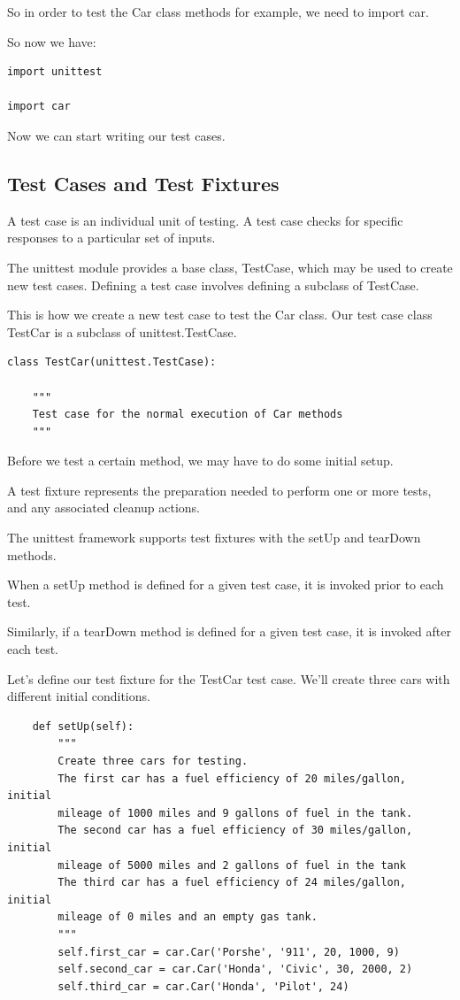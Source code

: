 \documentclass{article}
\begin{document}
So in order to test the Car class methods for example, we need to import car.

So now we have:

\begin{lstlisting}
import unittest

import car
\end{lstlisting}

Now we can start writing our test cases.

\subsection{Test Cases and Test Fixtures}
A test case is an individual unit of testing. A test case checks for specific responses to a particular set of inputs.

The unittest module provides a base class, TestCase, which may be used to create new test cases.  Defining a test case involves defining a subclass of TestCase.

This is how we create a new test case to test the Car class.  Our test case class TestCar is a subclass of unittest.TestCase.

\begin{lstlisting}
class TestCar(unittest.TestCase):
 
    """
    Test case for the normal execution of Car methods
    """
\end{lstlisting}

Before we test a certain method, we may have to do some initial setup.

A test fixture represents the preparation needed to perform one or more tests, and any associated cleanup actions.

The unittest framework supports test fixtures with the setUp and tearDown methods.

When a setUp method is defined for a given test case, it is invoked prior to each test. 

Similarly, if a tearDown method is defined for a given test case, it is invoked after each test. 

Let's define our test fixture for the TestCar test case. We'll create three cars with different initial conditions.

\begin{lstlisting}
    def setUp(self):
        """
        Create three cars for testing.
        The first car has a fuel efficiency of 20 miles/gallon, initial
        mileage of 1000 miles and 9 gallons of fuel in the tank.
        The second car has a fuel efficiency of 30 miles/gallon, initial
        mileage of 5000 miles and 2 gallons of fuel in the tank
        The third car has a fuel efficiency of 24 miles/gallon, initial
        mileage of 0 miles and an empty gas tank.
        """
        self.first_car = car.Car('Porshe', '911', 20, 1000, 9)
        self.second_car = car.Car('Honda', 'Civic', 30, 2000, 2)
        self.third_car = car.Car('Honda', 'Pilot', 24)
\end{lstlisting}
\end{document}
